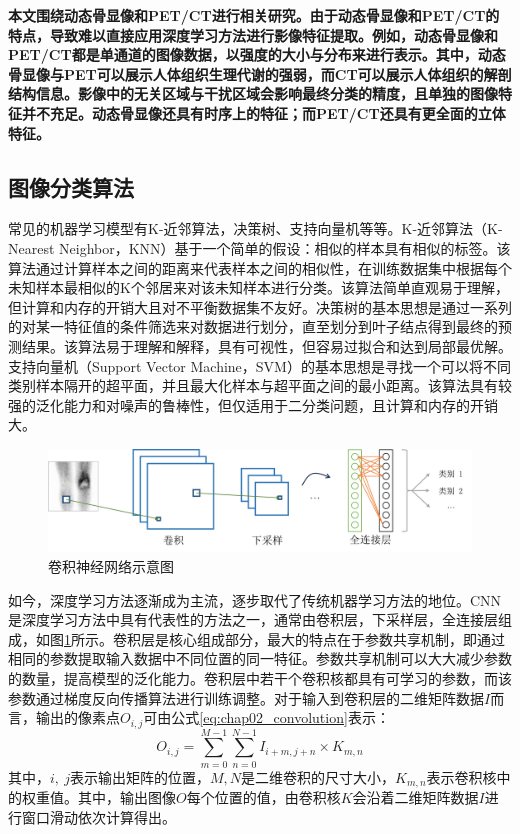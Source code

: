 \textbf{本文围绕动态骨显像和PET/CT进行相关研究。由于动态骨显像和PET/CT的特点，导致难以直接应用深度学习方法进行影像特征提取。例如，动态骨显像和PET/CT都是单通道的图像数据，以强度的大小与分布来进行表示。其中，动态骨显像与PET可以展示人体组织生理代谢的强弱，而CT可以展示人体组织的解剖结构信息。影像中的无关区域与干扰区域会影响最终分类的精度，且单独的图像特征并不充足。动态骨显像还具有时序上的特征；而PET/CT还具有更全面的立体特征。}

\subsection{图像分类算法}

常见的机器学习模型有K-近邻算法，决策树、支持向量机等等。K-近邻算法（K-Nearest Neighbor，KNN）\cite{guo2003knn}基于一个简单的假设：相似的样本具有相似的标签。该算法通过计算样本之间的距离来代表样本之间的相似性，在训练数据集中根据每个未知样本最相似的K个邻居来对该未知样本进行分类。该算法简单直观易于理解，但计算和内存的开销大且对不平衡数据集不友好。决策树\cite{suthaharan2016decision}的基本思想是通过一系列的对某一特征值的条件筛选来对数据进行划分，直至划分到叶子结点得到最终的预测结果。该算法易于理解和解释，具有可视性，但容易过拟合和达到局部最优解。支持向量机（Support Vector Machine，SVM）\cite{suthaharan2016support}的基本思想是寻找一个可以将不同类别样本隔开的超平面，并且最大化样本与超平面之间的最小距离。该算法具有较强的泛化能力和对噪声的鲁棒性，但仅适用于二分类问题，且计算和内存的开销大。

\begin{figure}[h]
    \centering
    \includegraphics[width=\textwidth]{figures/chap02_cnn.png}
    \caption{卷积神经网络示意图}
    \label{fig:chap02_cnn}
\end{figure}

如今，深度学习方法逐渐成为主流，逐步取代了传统机器学习方法的地位。CNN是深度学习方法中具有代表性的方法之一，通常由卷积层，下采样层，全连接层组成，如图\ref{fig:chap02_cnn}所示。卷积层是核心组成部分，最大的特点在于参数共享机制，即通过相同的参数提取输入数据中不同位置的同一特征。参数共享机制可以大大减少参数的数量，提高模型的泛化能力。卷积层中若干个卷积核都具有可学习的参数，而该参数通过梯度反向传播算法进行训练调整。对于输入到卷积层的二维矩阵数据\(I\)而言，输出的像素点\(O_{i,j}\)可由公式\ref{eq:chap02_convolution}表示：
\begin{equation}
    O_{i,j} = \sum_{m=0}^{M-1}\sum_{n=0}^{N-1}I_{i+m, j+n}\times K_{m,n}
    \label{eq:chap02_convolution}
\end{equation}
其中，\(i,\ j\)表示输出矩阵的位置，\(M,N\)是二维卷积的尺寸大小，\(K_{m,n}\)表示卷积核中的权重值。其中，输出图像\(O\)每个位置的值，由卷积核\(K\)会沿着二维矩阵数据\(I\)进行窗口滑动依次计算得出。


